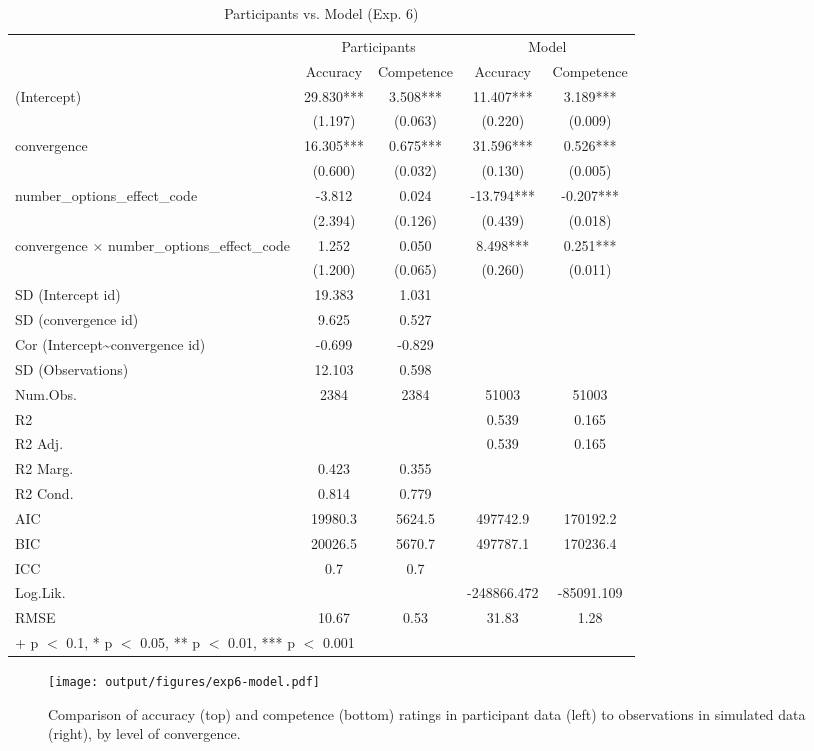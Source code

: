 \documentclass[
  doc,floatsintext]{apa6}
\begin{document}
\begin{table}
\centering
\caption{\label{tab:unnamed-chunk-98}Participants vs. Model (Exp. 6)}
\centering
\begin{tabular}[t]{lcccc}
\toprule
\multicolumn{1}{c}{ } & \multicolumn{2}{c}{Participants} & \multicolumn{2}{c}{Model} \\
\cmidrule(l{3pt}r{3pt}){2-3} \cmidrule(l{3pt}r{3pt}){4-5}
  & Accuracy & Competence & Accuracy  & Competence \\
\midrule
(Intercept) & 29.830*** & 3.508*** & 11.407*** & 3.189***\\
 & (1.197) & (0.063) & (0.220) & (0.009)\\
convergence & 16.305*** & 0.675*** & 31.596*** & 0.526***\\
 & (0.600) & (0.032) & (0.130) & (0.005)\\
number\_options\_effect\_code & -3.812 & 0.024 & -13.794*** & -0.207***\\
 & (2.394) & (0.126) & (0.439) & (0.018)\\
convergence × number\_options\_effect\_code & 1.252 & 0.050 & 8.498*** & 0.251***\\
 & (1.200) & (0.065) & (0.260) & (0.011)\\
SD (Intercept id) & 19.383 & 1.031 &  & \\
SD (convergence id) & 9.625 & 0.527 &  & \\
Cor (Intercept\textasciitilde{}convergence id) & -0.699 & -0.829 &  & \\
SD (Observations) & 12.103 & 0.598 &  & \\
\midrule
Num.Obs. & 2384 & 2384 & 51003 & 51003\\
R2 &  &  & 0.539 & 0.165\\
R2 Adj. &  &  & 0.539 & 0.165\\
R2 Marg. & 0.423 & 0.355 &  & \\
R2 Cond. & 0.814 & 0.779 &  & \\
AIC & 19980.3 & 5624.5 & 497742.9 & 170192.2\\
BIC & 20026.5 & 5670.7 & 497787.1 & 170236.4\\
ICC & 0.7 & 0.7 &  & \\
Log.Lik. &  &  & -248866.472 & -85091.109\\
RMSE & 10.67 & 0.53 & 31.83 & 1.28\\
\bottomrule
\multicolumn{5}{l}{\rule{0pt}{1em}+ p $<$ 0.1, * p $<$ 0.05, ** p $<$ 0.01, *** p $<$ 0.001}\\
\end{tabular}
\end{table}



\begin{figure}
\centering
\texttt{[image: output/figures/exp6-model.pdf]}
\caption{\label{fig:exp6-model}Comparison of accuracy (top) and competence (bottom) ratings in participant data (left) to observations in simulated data (right), by level of convergence.}
\end{figure}
\end{document}
